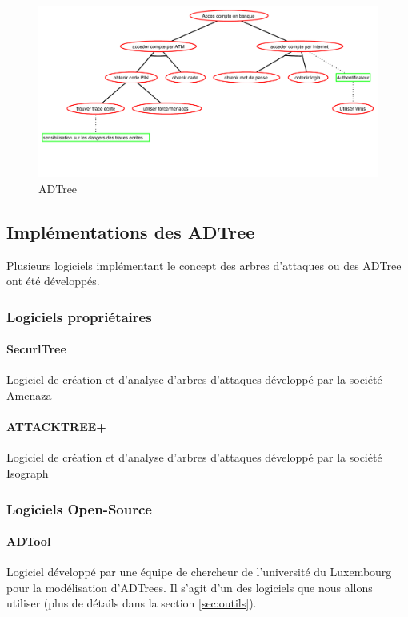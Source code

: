         \begin{figure}
            \begin{center}
                \includegraphics[width=1\textwidth]{figure/exemple2_rapport.pdf}
            \end{center}
            \caption{ADTree}
            \label{fig:arbre_exemple_2}
        \end{figure}

	\subsection{Implémentations des ADTree}
		Plusieurs logiciels implémentant le concept des arbres d'attaques ou des ADTree ont été développés.
        
        \subsubsection{Logiciels propriétaires}
            \paragraph{SecurlTree} Logiciel de création et d'analyse d'arbres d'attaques développé par la société Amenaza

            \paragraph{ATTACKTREE+} Logiciel de création et d'analyse d'arbres d'attaques développé par la société Isograph
        
        \subsubsection{Logiciels Open-Source}
            \paragraph{ADTool} Logiciel développé par une équipe de chercheur de l'université du Luxembourg pour la modélisation d'ADTrees. Il s'agit d'un des logiciels que nous allons utiliser (plus de détails dans la section \ref{sec:outils}).

